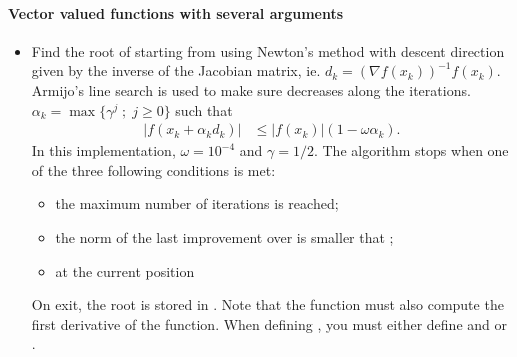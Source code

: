 \paragraph{Vector valued functions with several arguments}

\begin{itemize}
\item {}
  \sshortdescribe Find the root of  starting from  using
  Newton's method with descent direction given by the inverse of the Jacobian
  matrix, ie. $d_k = (\nabla f(x_k))^{-1} f(x_k)$. Armijo's line search is used to make sure 
  decreases along the iterations. $\alpha_k = \max\{ \gamma^j \; ; \; j \ge 0\}$
  such that
  \begin{align*}
    |f(x_k + \alpha_k d_k)| & \le |f(x_k)| (1 - \omega \alpha_k).
  \end{align*}
  In this implementation, $\omega = 10^{-4}$ and $\gamma = 1/2$.  The algorithm
  stops when one of the three following conditions is met:
  \begin{itemize}
    \item the maximum number of iterations  is reached;
    \item the norm of the last improvement over  is smaller that ;
    \item at the current position 
  \end{itemize}
  On exit, the root is stored in .  Note that the function  must
  also compute the first derivative of the function. When defining ,
  you must either define  and  or .
\end{itemize}

